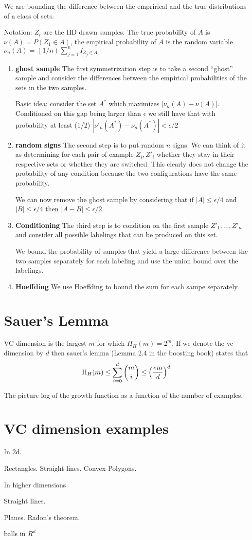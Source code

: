 \documentclass{report}
\theoremstyle{plain}
\theoremstyle{definition}
\begin{document}
We are bounding the difference between the emprirical and the true
distributions of a class of sets.

Notation: $Z_i$ are the IID drawn samples. The true probability of $A$
is $\nu(A) = P(Z_1 \in A)$, the empirical probability of $A$ is the
random variable $\nu_n(A) = (1/n) \sum_{j=1}^n I_{Z_j \in A}$


\begin{enumerate}
\item {\bf ghost sample} The first symmetrization step is to take a
  second ``ghost'' sample and consider the differences between the
  empirical probabilities of the sets in the two samples.

  Basic idea: consider the set $A^*$ which maximizes $|\nu_{n}(A) -
  \nu(A)|$. Conditioned on this gap being larger than $\epsilon$ we
  still have that with probability at least (1/2) $|\nu'_n(A^*) - \nu_n(A^*)| < \epsilon/2$

\item {\bf random signs} The second step is to put random $n$ signs. 
We can think of it as determining for each pair of example $Z_i,Z'_i$
whether they stay in their respective sets or whether they are
switched. This clearly does not change the probability of any
condition because the two configurations have the same probability.

We can now remove the ghost sample by considering that if $|A| \leq
\epsilon/4$ and $|B| \leq \epsilon/4$ then $|A-B| \leq \epsilon/2$.

\item{\bf Conditioning}
The third step is to condition on the first sample $Z'_1,\ldots,Z'_n$
and consider all possible labelings that can be produced on this set.

We bound the probability of samples that yield a large difference
between the two samples separately for each labeling and use the union
bound over the labelings.

\item {\bf Hoeffding} We use Hoeffding to bound the sum for each
  sampe separately.
\end{enumerate}

\section{Sauer's Lemma}

VC dimension is the largest $m$ for which $\Pi_H(m) = 2^m$. If we
denote the vc dimension by $d$ then sauer's lemma (Lemma 2.4 in the
boosting book) states that 
\[
\Pi_H(m) \leq \sum_{i=0}^d {m \choose i} \leq \left( {em \over d} \right)^d
\]

The picture log of the growth function as a function of the number of examples.

\section{VC dimension examples}

In 2d.

Rectangles. Straight lines. Convex Polygons.

In higher dimensions

Straight lines.

Planes. Radon's theorem. 

balls in $R^d$
\end{document}
